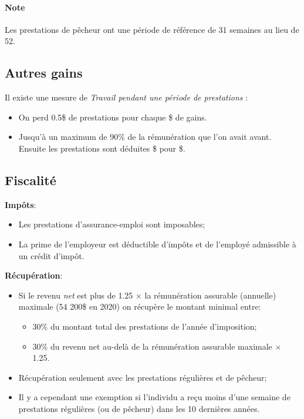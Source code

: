 \documentclass[10pt, french]{article}
\begin{document}
\begin{multicols*}{3}
\paragraph{Note}	Les prestations de pêcheur ont une période de référence de 31 semaines au lieu de 52.

\subsection*{Autres gains}

Il existe une mesure de \textit{Travail pendant une période de prestations} : 
\begin{itemize}
\item 	On perd 0.5\$ de prestations pour chaque \$ de gains.
\item	Jusqu'à un maximum de 90\% de la rémunération que l'on avait avant. Ensuite les prestations sont déduites \$ pour \$.
\end{itemize}

\subsection*{Fiscalité}

\begin{definitionNOHFILLsub}[Fiscalité]
\textbf{Impôts}:
\begin{itemize}[leftmargin = *]
	\item	Les prestations d'assurance-emploi sont imposables;
	\item	La prime de l'employeur est déductible d'impôts et de l'employé admissible à un crédit d'impôt.
\end{itemize}

\textbf{Récupération}:
\begin{itemize}[leftmargin = *]
	\item	Si le revenu \textit{net} est plus de 1.25 $\times$ la rémunération assurable (annuelle) maximale (54 200\$ en 2020) on récupère le montant minimal entre:
	\begin{itemize}[leftmargin = *]
	\item	30\% du montant total des prestations de l'année d'imposition;
	\item	30\% du revenu net au-delà de la rémunération assurable maximale $\times$ 1.25.
	\end{itemize}
	\item	 Récupération seulement avec les prestations régulières et de pêcheur;
	\item	Il y a cependant une exemption si l'individu a reçu moins d'une semaine de prestations régulières (ou de pêcheur) dans les 10 dernières années.
\end{itemize}


\end{definitionNOHFILLsub}
\end{multicols*}
\end{document}

